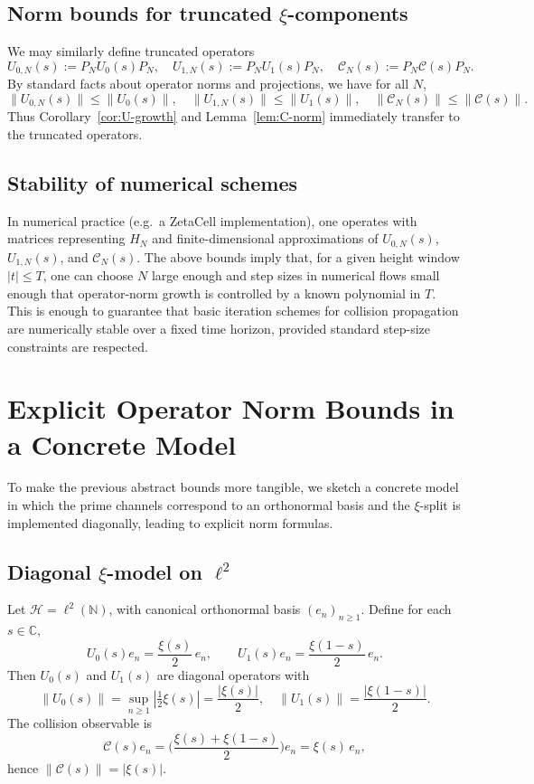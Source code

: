 \documentclass[11pt]{article}
\begin{document}
\subsection{Norm bounds for truncated $\xi$-components}

We may similarly define truncated operators
\[
  U_{0,N}(s) := P_N U_0(s) P_N, \quad U_{1,N}(s) := P_N U_1(s) P_N, \quad
  \mathcal{C}_N(s) := P_N \mathcal{C}(s) P_N.
\]
By standard facts about operator norms and projections, we have for all $N$,
\begin{equation}
  \|U_{0,N}(s)\| \le \|U_0(s)\|, \quad
  \|U_{1,N}(s)\| \le \|U_1(s)\|, \quad
  \|\mathcal{C}_N(s)\| \le \|\mathcal{C}(s)\|.
\end{equation}
Thus Corollary~\ref{cor:U-growth} and Lemma~\ref{lem:C-norm} immediately transfer to the truncated operators.

\subsection{Stability of numerical schemes}

In numerical practice (e.g.\ a ZetaCell implementation), one operates with matrices representing $H_N$ and finite-dimensional approximations of $U_{0,N}(s)$, $U_{1,N}(s)$, and $\mathcal{C}_N(s)$.  The above bounds imply that, for a given height window $|t|\le T$, one can choose $N$ large enough and step sizes in numerical flows small enough that operator-norm growth is controlled by a known polynomial in $T$.  This is enough to guarantee that basic iteration schemes for collision propagation are numerically stable over a fixed time horizon, provided standard step-size constraints are respected.

\section{Explicit Operator Norm Bounds in a Concrete Model}

To make the previous abstract bounds more tangible, we sketch a concrete model in which the prime channels correspond to an orthonormal basis and the $\xi$-split is implemented diagonally, leading to explicit norm formulas.

\subsection{Diagonal $\xi$-model on $\ell^2$}

Let $\mathcal{H}=\ell^2(\mathbb{N})$, with canonical orthonormal basis $(e_n)_{n\ge1}$.  Define for each $s\in\mathbb{C}$,
\[
  U_0(s) e_n = \frac{\xi(s)}{2}\, e_n, \qquad
  U_1(s) e_n = \frac{\xi(1-s)}{2}\, e_n.
\]
Then $U_0(s)$ and $U_1(s)$ are diagonal operators with
\[
  \|U_0(s)\| = \sup_{n\ge1} |\tfrac12\xi(s)| = \frac{|\xi(s)|}{2},\quad
  \|U_1(s)\| = \frac{|\xi(1-s)|}{2}.
\]
The collision observable is
\[
  \mathcal{C}(s) e_n = \biggl(\frac{\xi(s)+\xi(1-s)}{2}\biggr) e_n
  = \xi(s)\,e_n,
\]
hence $\|\mathcal{C}(s)\| = |\xi(s)|$.
\end{document}

